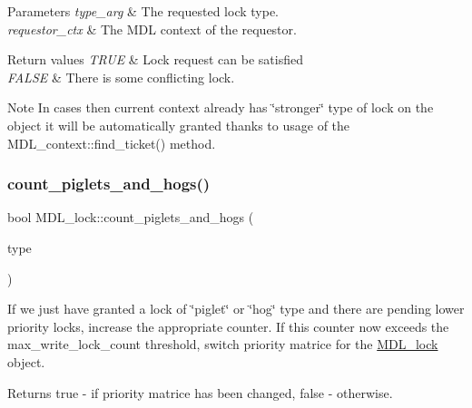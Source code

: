 \begin{DoxyParams}{Parameters}
{\em type\+\_\+arg} & The requested lock type. \\
\hline
{\em requestor\+\_\+ctx} & The M\+DL context of the requestor.\\
\hline
\end{DoxyParams}

\begin{DoxyRetVals}{Return values}
{\em T\+R\+UE} & Lock request can be satisfied \\
\hline
{\em F\+A\+L\+SE} & There is some conflicting lock.\\
\hline
\end{DoxyRetVals}
\begin{DoxyNote}{Note}
In cases then current context already has \char`\"{}stronger\char`\"{} type of lock on the object it will be automatically granted thanks to usage of the M\+D\+L\+\_\+context\+::find\+\_\+ticket() method. 
\end{DoxyNote}
\mbox{\label{classMDL__lock_a39f1b569ef4a8405826d9bc9720205c0}} 
\subsubsection{\texorpdfstring{count\+\_\+piglets\+\_\+and\+\_\+hogs()}{count\_piglets\_and\_hogs()}}
{\footnotesize\ttfamily bool M\+D\+L\+\_\+lock\+::count\+\_\+piglets\+\_\+and\+\_\+hogs (\begin{DoxyParamCaption}\item[{enum\+\_\+mdl\+\_\+type}]{type }\end{DoxyParamCaption})\hspace{0.3cm}{\ttfamily [inline]}}

If we just have granted a lock of \char`\"{}piglet\char`\"{} or \char`\"{}hog\char`\"{} type and there are pending lower priority locks, increase the appropriate counter. If this counter now exceeds the max\+\_\+write\+\_\+lock\+\_\+count threshold, switch priority matrice for the \mbox{\hyperlink{classMDL__lock}{M\+D\+L\+\_\+lock}} object.

\begin{DoxyReturn}{Returns}
true -\/ if priority matrice has been changed, false -\/ otherwise. 
\end{DoxyReturn}
\mbox{\label{classMDL__lock_a3d8389ffdedfe45d4fdc22624a3ad84a}} 
